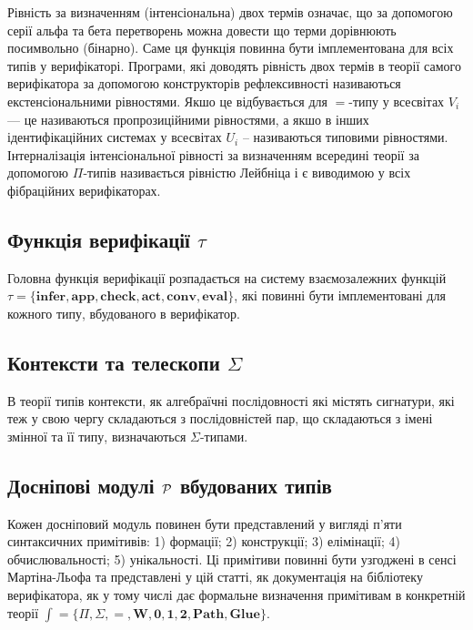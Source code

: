 Рівність за визначенням (інтенсіональна) двох термів означає, що за допомогою серії альфа та бета
перетворень можна довести що терми дорівнюють посимвольно (бінарно). Саме ця функція повинна бути
імплементована для всіх типів у верифікаторі. Програми, які доводять рівність двох термів
в теорії самого верифікатора за допомогою конструкторів рефлексивності називаються екстенсіональними рівностями.
Якшо це відбувається для $=$-типу у всесвітах $V_i$ --- це називаються пропрозиційними рівностями,
а якшо в інших ідентифікаційних системах у всесвітах $U_i$ -- називаються типовими рівностями.
Інтерналізація інтенсіональної рівності за визначенням всередині теорії за
допомогою $\Pi$-типів називається рівністю Лейбніца і є виводимою у всіх фібраційних верифікаторах.

\newpage
\subsection*{Функція верифікації $\tau$}

Головна функція верифікації  розпадається на систему взаємозалежних функцій
$\tau = \{ \mathbf{infer},\mathbf{app}, \mathbf{check}, \mathbf{act}, \mathbf{conv}, \mathbf{eval} \}$,
які повинні бути імплементовані для кожного типу, вбудованого в верифікатор.

\subsection*{Контексти та телескопи $\Sigma$ }

В теорії типів контексти, як алгебраїчні послідовності які містять сигнатури, які теж у свою
чергу складаються з послідовністей пар, що складаються з імені змінної та її типу, визначаються
$\Sigma$-типами.

\subsection*{Досніпові модулі $\mathcal{P}$ вбудованих типів}

Кожен досніповий модуль повинен бути представлений у вигляді п'яти
синтаксичних примітивів: 1) формації; 2) конструкції; 3) елімінації;
4) обчислювальності; 5) унікальності. Ці примітиви повинні бути узгоджені
в сенсі Мартіна-Льофа та представлені у цій статті,
як документація на бібліотеку верифікатора, як у тому числі дає формальне визначення
примітивам в конкретній теорії $\mathrm{\int} = \{ \Pi, \Sigma, =, \mathbf{W},
\mathbf{0}, \mathbf{1}, \mathbf{2}, \mathbf{Path}, \mathbf{Glue} \}$.

